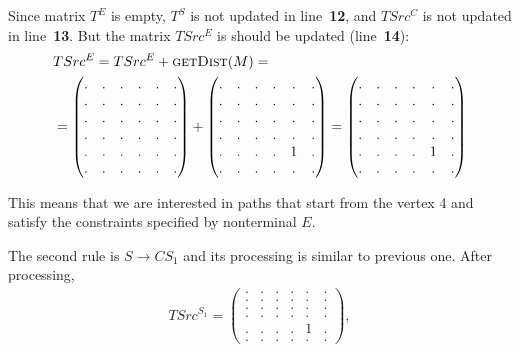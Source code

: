 Since matrix $T^E$ is empty, $T^S$ is not updated in line~\textbf{12}, and $TSrc^C$ is not updated in line~\textbf{13}.
But the matrix $TSrc^E$ is should be updated (line~\textbf{14}):
{
    \renewcommand{\arraystretch}{0.7}
    \setlength\arraycolsep{2pt}
\begin{align*}
&TSrc^E = TSrc^E + \textsc{getDist}(M) = \\ &=
\begin{pmatrix}
    . & . & . & . & . & . \\
    . & . & . & . & . & . \\
    . & . & . & . & . & . \\
    . & . & . & . & . & . \\ 
    . & . & . & . & . & . \\ 
    . & . & . & . & . & .
\end{pmatrix} +
\begin{pmatrix}
    . & . & . & . & . & . \\
    . & . & . & . & . & . \\
    . & . & . & . & . & . \\
    . & . & . & . & . & . \\ 
    . & . & . & . & 1 & . \\ 
    . & . & . & . & . & .
\end{pmatrix}= 
\begin{pmatrix}
    . & . & . & . & . & . \\
    . & . & . & . & . & . \\
    . & . & . & . & . & . \\
    . & . & . & . & . & . \\ 
    . & . & . & . & 1 & . \\ 
    . & . & . & . & . & .
\end{pmatrix}
\end{align*}
}

This means that we are interested in paths that start from the vertex 4 and satisfy the constraints specified by nonterminal $E$.

The second rule is $S \to C S_1$ and its processing is similar to previous one.
After processing,
{
    \renewcommand{\arraystretch}{0.7}
    \setlength\arraycolsep{2pt}
\begin{align*}
TSrc^{S_1} =
\begin{pmatrix}
    . & . & . & . & . & . \\
    . & . & . & . & . & . \\
    . & . & . & . & . & . \\
    . & . & . & . & . & . \\ 
    . & . & . & . & 1 & . \\ 
    . & . & . & . & . & .
\end{pmatrix},
\end{align*}
}


